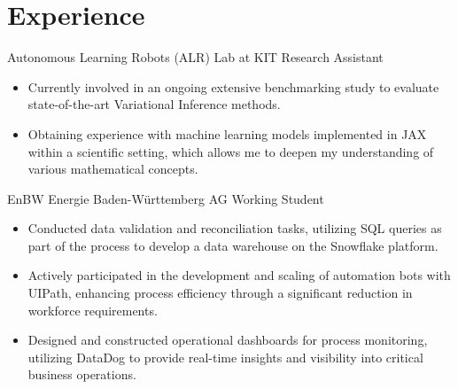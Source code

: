 \documentclass[11pt, letterpaper]{moderncv}
\newcommand{\de}[1]{}
\newcommand{\en}[1]{#1}
\newcommand{\de}[1]{#1}
\newcommand{\en}[1]{}
\begin{document}
\section{\en{Experience}\de{Berufserfahrung}}
\cventry{08.2023-\en{current}\de{heute}}
        {\en{Autonomous Learning Robots (ALR) Lab at KIT}\de{Autonome Lernende Roboter (ALR) am KIT}}
        {\en{Research Assistant}\de{Wissenschaftlicher Mitarbeiter}}
        {}
        {}
        {\en{
        \begin{itemize}
            \item Currently involved in an ongoing extensive benchmarking study to evaluate state-of-the-art Variational Inference methods.
            \item Obtaining experience with machine learning models implemented in JAX within a scientific setting, which allows me to deepen my understanding of various mathematical concepts.
        \end{itemize}}
        \de{
        \begin{itemize}
            \item Derzeit beteiligt an einer umfassenden Benchmarking-Studie zur Bewertung modernster Techniken Variational Inference. 
        \end{itemize}}
        }
        {EnBW Energie Baden-Württemberg AG}
        {\en{Working Student}\de{Werkstudent}}
        {}
        {}
        {\en{
        \begin{itemize}
            \item Conducted data validation and reconciliation tasks, utilizing SQL queries as part of the process to develop a data warehouse on the Snowflake platform.
            \item Actively participated in the development and scaling of automation bots with UIPath, enhancing process efficiency through a significant reduction in workforce requirements.
            \item Designed and constructed operational dashboards for process monitoring, utilizing DataDog to provide real-time insights and visibility into critical business operations.
        \end{itemize}}
        \de{
        \begin{itemize}
            \item Durchführung von Datenvalidierungs- und Abgleichsaufgaben unter Verwendung von SQL-Abfragen als Teil des Prozesses zur Entwicklung eines Data Warehouse auf der Snowflake-Plattform.
            \item Aktive Beteiligung an der Entwicklung und Skalierung von Automatisierungsrobotern mit UIPath zur Verbesserung der Prozesseffizienz und Workflow-Automatisierung.
            \item Entwicklung und Erstellung von operativen Dashboards für die Prozessüberwachung unter Verwendung von DataDog, um Echtzeiteinblicke und Einblicke in kritische Geschäftsvorgänge zu ermöglichen.
        \end{itemize}}
        }
\end{document}
